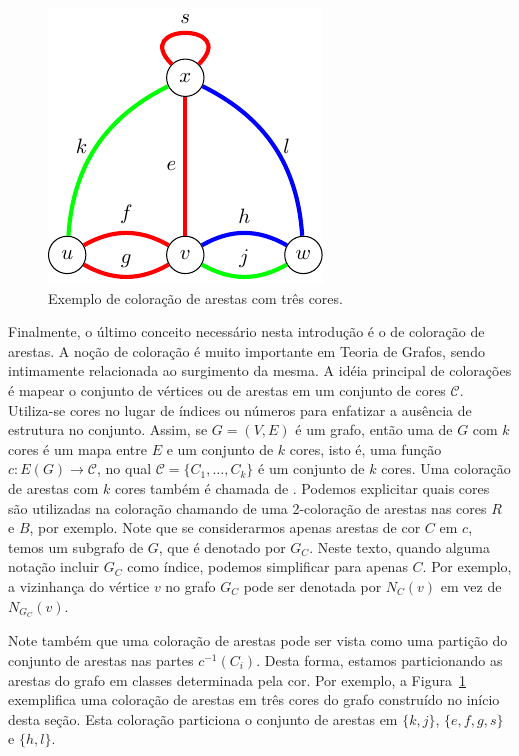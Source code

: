 \begin{figure}[ht!]
\centering
\includegraphics{figures/1_intro_4_excolouring}
\caption{Exemplo de coloração de arestas com três cores.}
\label{fig:intro:excolouring}
\end{figure}

Finalmente, o último conceito necessário nesta introdução é o de coloração de arestas. A noção de coloração é muito importante em Teoria de Grafos, sendo intimamente relacionada ao surgimento da mesma. A idéia principal de colorações é mapear o conjunto de vértices ou de arestas em um conjunto de cores $\mathcal{C}$. Utiliza-se cores no lugar de índices ou números para enfatizar a ausência de estrutura no conjunto. Assim, se $G = (V,E)$ é um grafo, então uma  de $G$ com $k$ cores é um mapa entre $E$ e um conjunto de $k$ cores, isto é, uma função $c: E(G) \to \mathcal{C}$, no qual $\mathcal{C} = \{ C_1, \dots, C_k\}$ é um conjunto de $k$ cores.
Uma coloração de arestas com $k$ cores também é chamada de . Podemos explicitar quais cores são utilizadas na coloração chamando de  uma 2-coloração de arestas nas cores $R$ e $B$, por exemplo. Note que se considerarmos apenas arestas de cor $C$ em $c$, temos um subgrafo de $G$, que é denotado por $G_C$.
Neste texto, quando alguma notação incluir $G_C$ como índice, podemos simplificar para apenas $C$. Por exemplo, a vizinhança do vértice $v$ no grafo $G_C$ pode ser denotada por $N_C(v)$ em vez de $N_{G_C}(v)$.

Note também que uma coloração de arestas pode ser vista como uma partição do conjunto de arestas nas partes $c^{-1}(C_i)$. Desta forma, estamos particionando as arestas do grafo em classes determinada pela cor. Por exemplo, a Figura~\ref{fig:intro:excolouring} exemplifica uma coloração de arestas em três cores do grafo construído no início desta seção. Esta coloração particiona o conjunto de arestas em $\{k,j\}$, $\{e,f,g,s\}$ e $\{h,l\}$.

